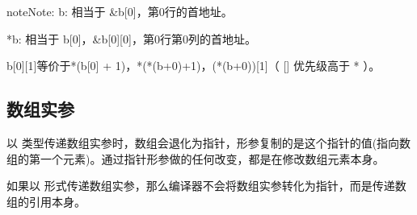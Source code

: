 \documentclass[letterpaper,10pt,english]{sphinxmanual}
\begin{document}
%
\begin{sphinxVerbatim}[commandchars=\\\{\}]
\PYG{p}{[}\PYG{p}{]}\PYG{p}{[}\PYG{p}{]}  \PYG{p}{[}\PYG{p}{]}      \PYG{p}{[}\PYG{p}{]}  \PYG{p}{[}\PYG{p}{[}\PYG{p}{]}\PYG{p}{]}
\PYG{p}{[}\PYG{p}{]}\PYG{p}{[}\PYG{p}{]}          \PYG{p}{[}\PYG{p}{]}    \PYG{p}{[}\PYG{p}{]}\PYG{p}{[}\PYG{p}{]}
\PYG{p}{[}\PYG{p}{]}\PYG{p}{[}\PYG{p}{]}          \PYG{p}{[}\PYG{p}{[}\PYG{p}{]}\PYG{p}{]}
\end{sphinxVerbatim}

\begin{sphinxadmonition}{note}{Note:}
b: 相当于 \&b{[}0{]}，第0行的首地址。

*b: 相当于 b{[}0{]}，\&b{[}0{]}{[}0{]}，第0行第0列的首地址。

b{[}0{]}{[}1{]}等价于*(b{[}0{]} + 1)，*(*(b+0)+1)，(*(b+0)){[}1{]}（ {[}{]} 优先级高于 * ）。
\end{sphinxadmonition}


\subsection{数组实参}
\label{\detokenize{cpp/02_array:id6}}
以  类型传递数组实参时，数组会退化为指针，形参复制的是这个指针的值(指向数组的第一个元素)。通过指针形参做的任何改变，都是在修改数组元素本身。

如果以  形式传递数组实参，那么编译器不会将数组实参转化为指针，而是传递数组的引用本身。
\end{document}
